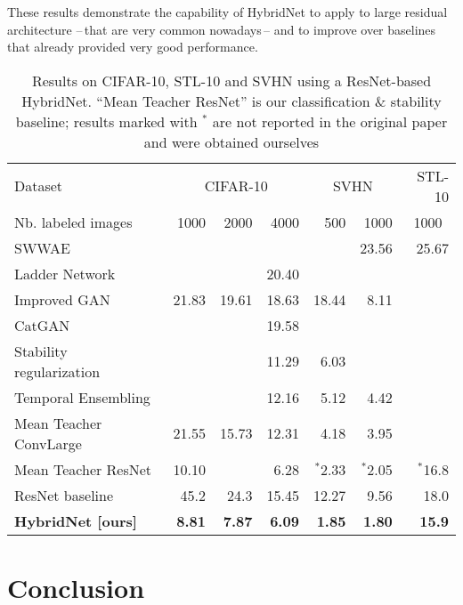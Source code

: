 \documentclass[runningheads]{llncs}
\begin{document}
These results demonstrate the capability of HybridNet to apply to large residual architecture --\,that are very common nowadays\,-- and to improve over baselines that already provided very good performance.

\begin{table}[tb]
  \setlength{\tabcolsep}{4pt}
  \caption{Results on CIFAR-10, STL-10 and SVHN using a ResNet-based HybridNet. ``Mean Teacher ResNet'' is our classification \& stability baseline; results marked with ${}^*$ are not reported in the original paper and were obtained ourselves }
  \label{table:cifar10}
  \centering
  \begin{tabular}{@{}lrrrrrr@{}}
    \toprule
    Dataset                                    & \multicolumn{3}{c}{CIFAR-10} & \multicolumn{2}{c}{SVHN} & $\!\!\!$STL-10 \\
    \cmidrule{2-7}
    Nb. labeled images & 1000  & 2000 & 4000 & 500 & 1000 & \multicolumn{1}{c}{1000} \\
    \midrule
    SWWAE~\cite{Zhao2016a}                         &   &   &   & & 23.56 & 25.67 \\
    Ladder Network~\cite{Rasmus2015}                  &&       & 20.40      \\
    Improved GAN~\cite{Salimans2016}              & 21.83 & 19.61 & 18.63 & 18.44 & 8.11 &  \\
    CatGAN~\cite{Springenberg2015}                    &&       & 19.58      \\
    Stability regularization~\cite{Sajjadi2016}    &&       & 11.29  & 6.03 & &      \\
    Temporal Ensembling~\cite{Laine2016}           &&       & 12.16 & 5.12 & 4.42  \\
    Mean Teacher ConvLarge~\cite{Tarvainen2017}              & 21.55 & 15.73 & 12.31 & 4.18 & 3.95 \\
    Mean Teacher ResNet~\cite{Tarvainen2017}          & 10.10  &      & 6.28 & ${}^*$2.33 & ${}^*$2.05 & ${}^*$16.8        \\
    \cmidrule{1-7}
    ResNet baseline~\cite{Gastaldi2017}						 & 45.2 & 24.3 & 15.45 & 12.27 & 9.56 & 18.0  \\
    \textbf{HybridNet [ours]}  & \textbf{8.81} & \textbf{7.87} & \textbf{6.09} & \textbf{1.85} & \textbf{1.80} & \textbf{15.9} \\
    \bottomrule
  \end{tabular}
\end{table}

\section{Conclusion}
\end{document}
